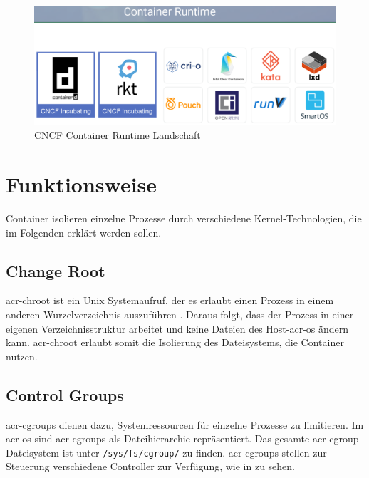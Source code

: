 \begin{figure}[H]
	\begin{center}
		\includegraphics[scale=0.3]{bilder/cncf-container-landscape.png}
		\caption{CNCF Container Runtime Landschaft \citep{CNCFCloudNativeInteractiveLandscape}}
		\label{fig:cncfContainerLandscape}
	\end{center}
\end{figure} 

\section{Funktionsweise}
\label{sec:funktionsweise}

Container isolieren einzelne Prozesse durch verschiedene Kernel-Technologien, die im Folgenden erklärt werden sollen.
\subsection{Change Root}
\label{sec:chroot}
\Gls{acr-chroot} ist ein Unix Systemaufruf, der es erlaubt einen Prozess in einem anderen Wurzelverzeichnis auszuführen \citep{Chroot1LinuxManualPage}. Daraus folgt, dass der Prozess in einer eigenen Verzeichnisstruktur arbeitet und keine Dateien des Host-\gls{acr-os} ändern kann. \Gls{acr-chroot} erlaubt somit die Isolierung des Dateisystems, die Container nutzen.

\subsection{Control Groups}
\label{sec:cgroups}
\Glspl{acr-cgroup} dienen dazu, Systemressourcen für einzelne Prozesse zu limitieren. Im \gls{acr-os} sind \glspl{acr-cgroup} als Dateihierarchie repräsentiert. Das gesamte \gls{acr-cgroup}-Dateisystem ist unter \texttt{/sys/fs/cgroup/} zu finden. \Glspl{acr-cgroup} stellen zur Steuerung verschiedene Controller zur Verfügung, wie in  zu sehen.

